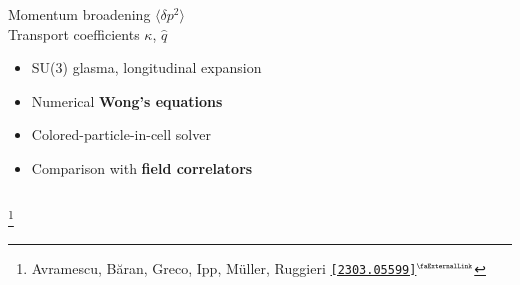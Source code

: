 \documentclass[aspectratio=169,11pt,usenames,dvipsnames]{beamer}
\renewcommand{\thefootnote}{\color{customblue}\faPaperPlaneO}
\newcommand\blfootnote[1]{%
  \begingroup
  \renewcommand\thefootnote{}\footnote{#1}%
  \addtocounter{footnote}{-1}%
  \endgroup
}
\begin{document}
\begin{frame}[t]
\begin{columns}[onlytextwidth,t]
        \begin{center}
            {\Large\color{palteal} Momentum broadening $\langle \delta p^2\rangle$\\[5pt]
            Transport coefficients $\kappa$, $\hat{q}$  \\[10pt]}
            \footnotesize
                \begin{itemize}
                    \item {\color{lightgray}SU(3) glasma, longitudinal expansion}
                    \item {\color{lightgray}Numerical {\bfseries Wong's equations}}
                    \item {\color{lightgray}Colored-particle-in-cell solver}
                    \item {\color{lightgray}Comparison with {\bfseries field correlators}}
                \end{itemize}
        \end{center}
    \end{columns}
    \blfootnote{\scriptsize Avramescu, Băran, Greco, Ipp, Müller, Ruggieri \href{https://arxiv.org/abs/2303.05599}{\color{palgold}\texttt{[2303.05599]}$^\text{\tiny\faExternalLink}$}}
\end{frame}



\end{document}
